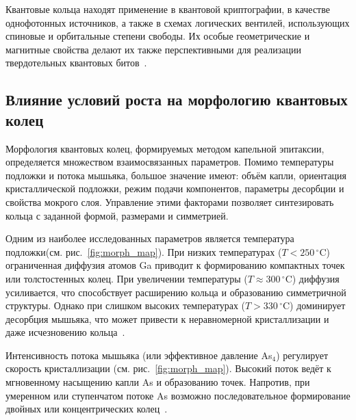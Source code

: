 \documentclass[14pt,oneside]{extarticle}
\begin{document}
Квантовые кольца находят применение в квантовой криптографии, в качестве однофотонных источников, а также в схемах логических вентилей, использующих спиновые и орбитальные степени свободы. Их особые геометрические и магнитные свойства делают их также перспективными для реализации твердотельных квантовых битов~\cite{Liu2019}.

\subsection{Влияние условий роста на морфологию квантовых колец}

Морфология квантовых колец, формируемых методом капельной эпитаксии, определяется множеством взаимосвязанных параметров. Помимо температуры \\ 
подложки и потока мышьяка, большое значение имеют: объём капли, ориентация кристаллической подложки, режим подачи компонентов, параметры десорбции и свойства мокрого слоя. Управление этими факторами позволяет синтезировать кольца с заданной формой, размерами и симметрией.

Одним из наиболее исследованных параметров является температура подложки(см. рис.~\ref{fig:morph_map}). При низких температурах ($T < 250\,^{\circ}\mathrm{C}$) ограниченная диффузия атомов Ga приводит к формированию компактных точек или толстостенных колец. При увеличении температуры ($T \approx 300\,^{\circ}\mathrm{C}$) диффузия усиливается, что способствует расширению кольца и образованию симметричной структуры. Однако при слишком высоких температурах ($T > 330\,^{\circ}\mathrm{C}$) доминирует десорбция мышьяка, что может привести к неравномерной кристаллизации и даже исчезновению кольца~\cite{sibirmovskiy2014,vasilevskiy2013}.

Интенсивность потока мышьяка (или эффективное давление As$_4$) регулирует скорость кристаллизации (см. рис.~\ref{fig:morph_map}). Высокий поток ведёт к мгновенному насыщению капли As и образованию точек. Напротив, при умеренном или ступенчатом потоке As возможно последовательное формирование двойных или концентрических колец~\cite{zhou2013,fan2023}.
\end{document}
